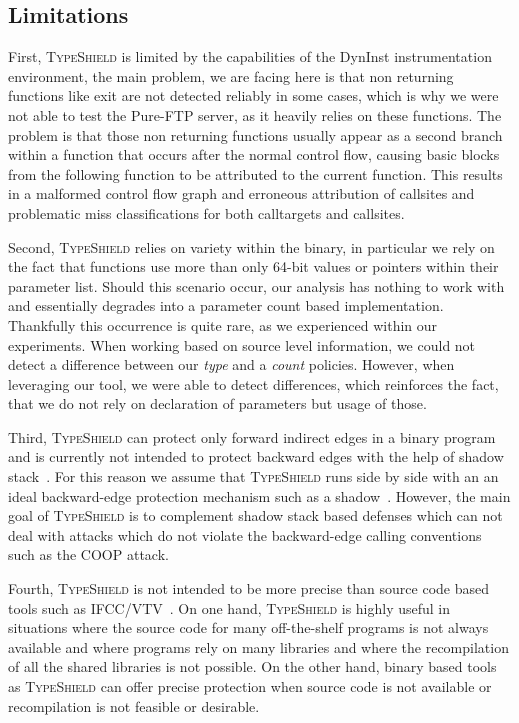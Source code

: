 \subsection{Limitations}
First, \textsc{TypeShield} is limited by the capabilities of the DynInst instrumentation environment, the main problem,
we are facing here is that non returning functions like exit are not detected reliably in some cases, which is
why we were not able to test the Pure-FTP server, as it heavily relies on these functions. The problem is that
those non returning functions usually appear as a second branch within a function that occurs after the normal
control flow, causing basic blocks from the following function to be attributed to the current function. This
results in a malformed control flow graph and erroneous attribution of callsites and problematic miss classifications
for both calltargets and callsites.

Second, \textsc{TypeShield} relies on variety within the binary, in particular we rely on
the fact that functions use more than only 64-bit values or pointers within their parameter list. Should this
scenario occur, our analysis has nothing to work with and essentially degrades into a parameter count based
implementation. Thankfully this occurrence is quite rare, as we experienced within our experiments. When working
based on source level information, we could not detect a difference between our \textit{type} and a \textit{count} policies. 
However, when leveraging our tool, we were able to detect differences, which reinforces the fact, that we do 
not rely on declaration of parameters but usage of those.

Third, \textsc{TypeShield} can protect only forward indirect edges in a binary program and is currently not 
intended to protect backward edges with the help of shadow stack~\cite{dang:asiaccs}. For this reason we assume that 
\textsc{TypeShield} runs side by side with an an ideal backward-edge protection mechanism such as a shadow~\cite{conti:ccs}. 
However, the main goal of \textsc{TypeShield} is to complement shadow stack based defenses which can not deal with attacks 
which do not violate the backward-edge calling conventions such as the COOP attack.

Fourth, \textsc{TypeShield} is not intended to be more precise than source code based tools such as 
IFCC/VTV~\cite{vtv:tice}.
On one hand, \textsc{TypeShield} is highly useful in situations where
the source code for many off-the-shelf programs is not always available and where
programs rely on many libraries and where the recompilation of all the shared libraries 
is not possible. On the other hand, binary based tools as \textsc{TypeShield} can offer precise protection when
source code is not available or recompilation is not feasible or desirable.

